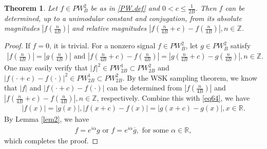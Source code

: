 \documentclass[12pt,oneside,reqno]{amsart}
\newtheorem{theorem}{Theorem}[section]
\newcommand{\Z}{\mathbb{Z}}
\newcommand{\R}{\mathbb{R}}
\numberwithin{equation}{section}
\begin{document}
\begin{theorem}\label{thm2}
	Let $f\in PW_B^2$ be as in \eqref{PW.def} and $0<c\le \frac{1}{2B}$. Then $f$ can be determined, up to a unimodular constant and conjugation, from its absolute magnitudes $ |f(\frac{n}{4B})|$ and  relative magnitudes $ |f(\frac{n}{4B} + c)-f(\frac{n}{4B})|, n\in \Z $.
\end{theorem}
\begin{proof}
	If $f=0$, it is trivial. For a nonzero signal $f\in PW_{B}^2$, let 
	$g\in PW_B^2$ satisfy 
	\begin{align}\label{eq64}
		|f(\frac{n}{4B})| = |g(\frac{n}{4B})| \text{ and } |f(\frac{n}{4B} + c)-f(\frac{n}{4B})| = |g(\frac{n}{4B} + c)-g(\frac{n}{4B})|,  n\in \Z.
	\end{align}
	One may easily verify that $|f|^2\in PW_{2B}^1\subset PW_{2B}^2$ and $|f(\cdot+ c)- f(\cdot)|^2 \in PW_{2B}^1\subset PW_{2B}^2$. By the WSK sampling theorem, we know that $|f|$ and $|f(\cdot+ c)- f(\cdot)|$ can be determined from  $|f(\frac{n}{4B})|$ and  $ |f(\frac{n}{4B} + c)-f(\frac{n}{4B})|, n\in \Z$, respectively. Combine this with \eqref{eq64}, we have 
	\begin{align*}
		|f(x)|=|g(x)|, |f(x+c)-f(x)|=|g(x+c)-g(x)|, x\in \R.
	\end{align*}
	By Lemma \ref{lem2}, we have
	\begin{align*}
		f=e^{i\alpha} g \text{ or } f=e^{i\alpha} \overline{g}, \text{ for some } \alpha \in \R,
	\end{align*}
	which completes the proof.
\end{proof}
\end{document}
